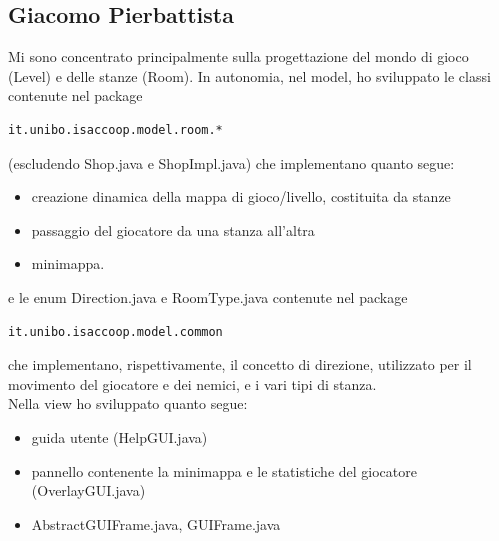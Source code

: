 \documentclass[a4paper,12pt]{report}
\begin{document}
\subsection*{Giacomo Pierbattista}
Mi sono concentrato principalmente sulla progettazione del mondo di gioco (Level) e delle stanze (Room).
In autonomia, nel model, ho sviluppato le classi contenute nel package
\begin{verbatim}it.unibo.isaccoop.model.room.* \end{verbatim} (escludendo Shop.java e ShopImpl.java)
che implementano quanto segue:
\begin{itemize}
    \item creazione dinamica della mappa di gioco/livello, costituita da stanze
    \item passaggio del giocatore da una stanza all'altra
    \item minimappa.
\end{itemize}
e le enum Direction.java e RoomType.java contenute nel package
\begin{verbatim}it.unibo.isaccoop.model.common \end{verbatim}
che implementano, rispettivamente, il concetto di direzione, utilizzato per il movimento del giocatore e
dei nemici, e i vari tipi di stanza.
\\Nella view ho sviluppato quanto segue:
\begin{itemize}
    \item guida utente (HelpGUI.java)
    \item pannello contenente la minimappa e le statistiche del giocatore (OverlayGUI.java)
    \item AbstractGUIFrame.java, GUIFrame.java
\end{itemize}
\end{document}
